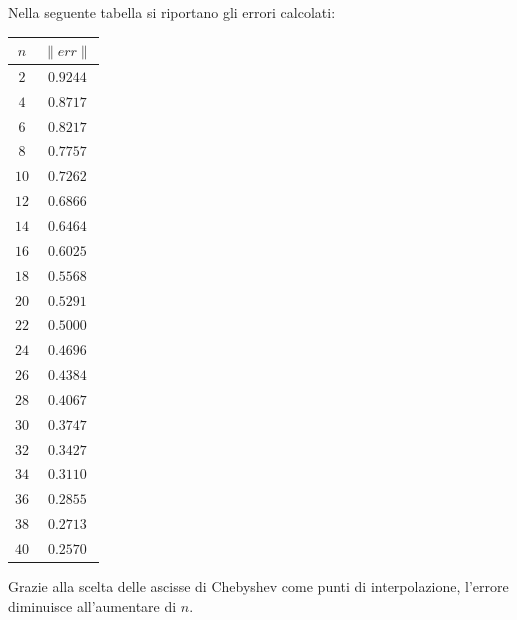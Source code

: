 \noindent Nella seguente tabella si riportano gli errori calcolati: 

\begin{center}
	\begin{tabular}{|c|c|}
		\hline
		$n$ & $\|err\|$ \\
		\hline
		$2$  & $0.9244$ \\
		$4$  & $0.8717$ \\
		$6$  & $0.8217$ \\
		$8$  & $0.7757$ \\
		$10$ & $0.7262$ \\
		$12$ & $0.6866$ \\
		$14$ & $0.6464$ \\
		$16$ & $0.6025$ \\
		$18$ & $0.5568$ \\
		$20$ & $0.5291$ \\
		$22$ & $0.5000$ \\
		$24$ & $0.4696$ \\
		$26$ & $0.4384$ \\
		$28$ & $0.4067$ \\
		$30$ & $0.3747$ \\
		$32$ & $0.3427$ \\
		$34$ & $0.3110$ \\
		$36$ & $0.2855$ \\
		$38$ & $0.2713$ \\
		$40$ & $0.2570$ \\
		\hline
	\end{tabular}
\end{center} 


\noindent Grazie alla scelta delle ascisse di Chebyshev come punti di interpolazione, l'errore diminuisce all'aumentare di \(n\).